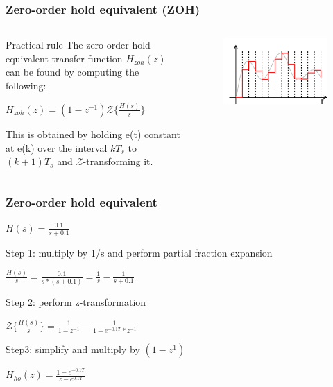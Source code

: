 \begin{frame}
	\frametitle{Zero-order hold equivalent (ZOH)}
\begin{columns}
	\begin{column}{0.5\textwidth}
	\begin{block}{Practical rule}
		The zero-order hold equivalent transfer function $H_{zoh}(z)$ can be found by computing the following:
		\begin{center}
			$H_{zoh}(z) = (1 - z^{-1}) \mathcal{Z}\{\frac{H(s)}{s}\}$
		\end{center}
		This is obtained by holding e(t) constant at e(k) over the interval $kT_s$ to $(k+1)T_s$ and $\mathcal{Z}$-transforming it.
	\end{block}
	\end{column}
	
	\begin{column}{0.5\textwidth}
		\begin{figure}
			\centering
			\includegraphics[width=1\linewidth]{zero-order}
		\end{figure}
	\end{column}
\end{columns}
\end{frame}

\begin{frame}
	\frametitle{Zero-order hold equivalent}
	\begin{example}
		\begin{center}
			$H(s) = \frac{0.1}{s + 0.1}$
		\end{center}
		Step 1: multiply by 1/s and perform partial fraction expansion
		\begin{center}
			$\frac{H(s)}{s} = \frac{0.1}{s * (s + 0.1)} = \frac{1}{s} - \frac{1}{s + 0.1}$
		\end{center}
		Step 2: perform z-transformation
		\begin{center}
			$\mathcal{Z} \{\frac{H(s)}{s}\} = \frac{1}{1 - z^{-1}} - \frac{1}{1 - e^{-0.1T} * z^{-1}}$
		\end{center}
		Step3: simplify and multiply by $(1-z^{1})$
		\begin{center}
			$H_{ho}(z) = \frac{1 - e^{-0.1T}}{z - e^{0.1T}}$
		\end{center}
	\end{example}
\end{frame}

